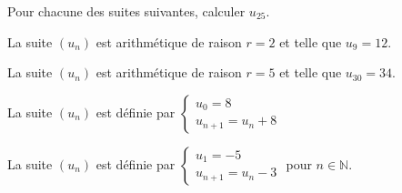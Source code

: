 \documentclass[12pt,a4paper]{article}  %
\begin{document}
Pour chacune des suites suivantes, calculer $u_{25}$.
\begin{enumMet}
    \item La suite $\left(u_{n}\right)$ est arithmétique de raison $r=2$ et telle que $u_{9}=12$.
    \item La suite $\left(u_{n}\right)$ est arithmétique de raison $r=5$ et telle que $u_{30}=34$.
    \item La suite $\left(u_{n}\right)$ est définie par $\left\{\begin{array}{l}u_{0}=8 \\ u_{n+1}=u_{n}+8\end{array}\right.$
    \item {} La suite $\left(u_{n}\right)$ est définie par $\left\{\begin{array}{l}u_{1}=-5 \\ u_{n+1}=u_{n}-3\end{array}\right.$ pour $n \in \mathbb{N}$.
\end{enumMet}
\end{document}
